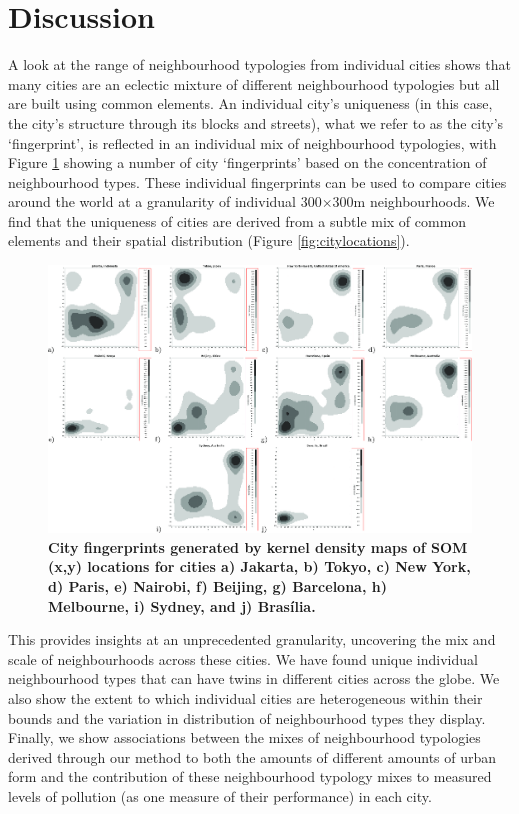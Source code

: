 \documentclass[9pt,twocolumn,twoside,lineno]{pnas-new}
\begin{document}
\section*{Discussion}


A look at the range of neighbourhood typologies from individual cities shows that many cities are an eclectic mixture of different neighbourhood typologies but all are built using common elements. An individual city's uniqueness (in this case, the city's structure through its blocks and streets), what we refer to as the city's `fingerprint', is reflected in an individual mix of neighbourhood typologies, with Figure \ref{fig:kernel} showing a number of city `fingerprints' based on the concentration of neighbourhood types. These individual fingerprints can be used to compare cities around the world at a granularity of individual 300$\times$300m neighbourhoods. We find that the uniqueness of cities are derived from a subtle mix of common elements and their spatial distribution (Figure \ref{fig:citylocations}).

\begin{figure}
\centering
\includegraphics[width=.8\linewidth]{BlockTypologies_Figures2-1.png}
\caption{\bf City fingerprints generated by kernel density maps of SOM (x,y) locations for cities 
a) Jakarta,
b) Tokyo, 
c) New York, 
d) Paris,
e) Nairobi,
f) Beijing, 
g) Barcelona, 
h) Melbourne, 
i) Sydney, and
j) Bras\'{i}lia.
}
 \label{fig:kernel}
\end{figure} 

This provides insights at an unprecedented granularity, uncovering the mix and scale of neighbourhoods across these cities. We have found unique individual neighbourhood types that can have twins in different cities across the globe. We also show the extent to which individual cities are heterogeneous within their bounds and the variation in distribution of neighbourhood types they display. Finally, we show associations between the mixes of neighbourhood typologies derived through our method to both the amounts of different amounts of urban form and the contribution of these neighbourhood typology mixes to measured levels of pollution (as one measure of their performance) in each city. 
\end{document}
